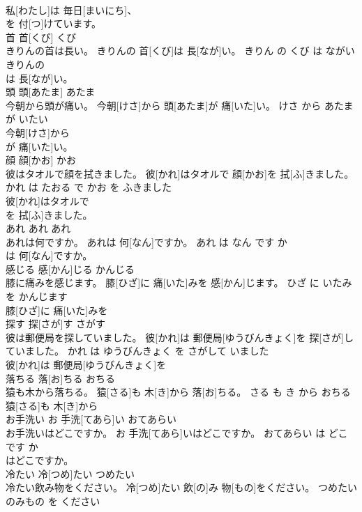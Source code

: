 \documentclass[8pt]{extreport}
\begin{document}
\begin{CJK}{UTF8}{min}
\\	私[わたし]は 毎日[まいにち]、
\\	を 付[つ]けています。		
\\	首	首[くび]	くび	
\\	きりんの首は長い。	きりんの 首[くび]は 長[なが]い。	きりん の くび は ながい	
\\	きりんの
\\	は 長[なが]い。		
\\	頭	頭[あたま]	あたま	
\\	今朝から頭が痛い。	今朝[けさ]から 頭[あたま]が 痛[いた]い。	けさ から あたま が いたい	
\\	今朝[けさ]から
\\	が 痛[いた]い。		
\\	顔	顔[かお]	かお	
\\	彼はタオルで顔を拭きました。	彼[かれ]はタオルで 顔[かお]を 拭[ふ]きました。	かれ は たおる で かお を ふきました	
\\	彼[かれ]はタオルで
\\	を 拭[ふ]きました。		
\\	あれ	あれ	あれ	
\\	あれは何ですか。	あれは 何[なん]ですか。	あれ は なん です か	
\\	は 何[なん]ですか。		
\\	感じる	感[かん]じる	かんじる	
\\	膝に痛みを感じます。	膝[ひざ]に 痛[いた]みを 感[かん]じます。	ひざ に いたみ を かんじます	
\\	膝[ひざ]に 痛[いた]みを
\\	探す	探[さが]す	さがす	
\\	彼は郵便局を探していました。	彼[かれ]は 郵便局[ゆうびんきょく]を 探[さが]していました。	かれ は ゆうびんきょく を さがして いました	
\\	彼[かれ]は 郵便局[ゆうびんきょく]を
\\	落ちる	落[お]ちる	おちる	
\\	猿も木から落ちる。	猿[さる]も 木[き]から 落[お]ちる。	さる も き から おちる	
\\	猿[さる]も 木[き]から
\\	お手洗い	お 手洗[てあら]い	おてあらい	
\\	お手洗いはどこですか。	お 手洗[てあら]いはどこですか。	おてあらい は どこ です か	
\\	はどこですか。		
\\	冷たい	冷[つめ]たい	つめたい	
\\	冷たい飲み物をください。	冷[つめ]たい 飲[の]み 物[もの]をください。	つめたい のみもの を ください	

\end{CJK}
\end{document}
